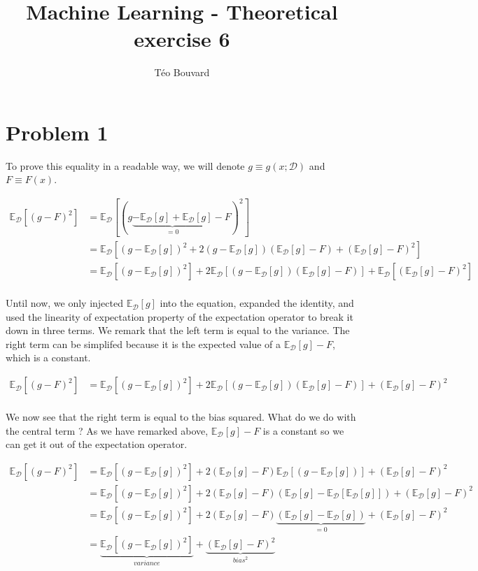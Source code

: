 \documentclass[a4paper, 10pt, twoside]{article}
\begin{document}
\title{Machine Learning - Theoretical exercise 6}
\author{T\'eo Bouvard}
\maketitle

\section*{Problem 1}

\newcommand{\ED}[1]{\mathbb{E}_\mathcal{D}\left[#1\right]}

To prove this equality in a readable way, we will denote $g \equiv g\left(x;\mathcal{D}\right)$ and $F \equiv F(x)$.

\begin{align*}
	\ED{(g-F)^2}
	 & = \ED{(g \underbrace{- \ED{g} + \ED{g}}_{= 0} - F)^2}                         \\
	 & = \ED{(g - \ED{g})^2 + 2 (g - \ED{g})(\ED{g} - F) + (\ED{g} - F)^2}           \\
	 & = \ED{(g - \ED{g})^2} + 2 \ED{(g - \ED{g})(\ED{g} - F)} + \ED{(\ED{g} - F)^2} \\
\end{align*}

Until now, we only injected $\ED{g}$ into the equation, expanded the identity, and used the linearity of expectation property of the expectation operator to break it down in three terms. We remark that the left term is equal to the variance. The right term can be simplifed because it is the expected value of a $\ED{g} - F$, which is a constant.

\begin{align*}
	\ED{(g-F)^2} & = \ED{(g - \ED{g})^2} + 2 \ED{(g - \ED{g})(\ED{g} - F)} + (\ED{g} - F)^2 \\
\end{align*}

We now see that the right term is equal to the bias squared. What do we do with the central term ? As we have remarked above, $\ED{g} - F$ is a constant so we can get it out of the expectation operator.

\begin{align*}
	\ED{(g-F)^2}
	 & = \ED{(g - \ED{g})^2} + 2 (\ED{g} - F) \ED{(g - \ED{g})} + (\ED{g} - F)^2                   \\
	 & = \ED{(g - \ED{g})^2} + 2 (\ED{g} - F) (\ED{g} - \ED{\ED{g}}) + (\ED{g} - F)^2              \\
	 & = \ED{(g - \ED{g})^2} + 2 (\ED{g} - F) \underbrace{(\ED{g} - \ED{g})}_{=0} + (\ED{g} - F)^2 \\
	 & = \underbrace{\ED{(g - \ED{g})^2}}_{variance} + \underbrace{(\ED{g} - F)^2}_{bias^2}        \\
\end{align*}
\end{document}
